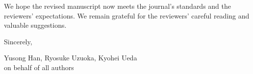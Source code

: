 \documentclass[11pt,a4paper]{article}
\begin{document}
We hope the revised manuscript now meets the journal's standards and the
reviewers' expectations. We remain grateful for the reviewers' careful
reading and valuable suggestions.

\vspace{1em}

\noindent Sincerely,

\vspace{0.5em}

\noindent Yusong Han, Ryosuke Uzuoka, Kyohei Ueda \\
on behalf of all authors



\end{document}
